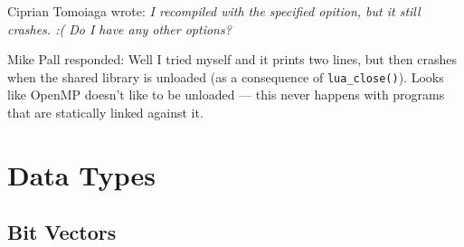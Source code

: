 Ciprian Tomoiaga wrote:
{\it I recompiled with the specified opition, but it still crashes. :(
Do I have any other options? }

Mike Pall responded: 
Well I tried myself and it prints two lines, but then crashes when
the shared library is unloaded (as a consequence of \verb+lua_close()+).
Looks like OpenMP doesn't like to be unloaded --- this never
happens with programs that are statically linked against it.


\section{Data Types}

\subsection{Bit Vectors}
